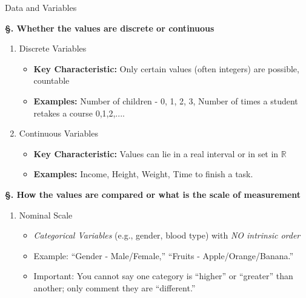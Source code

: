 \documentclass[8pt, usepdftitle=false]{beamer}
\begin{document}
\begin{frame}[allowframebreaks]{Data and Variables}
\begin{itemize}
\bigskip

\textbf{\S.  Whether the values are discrete or continuous}
\medskip
\begin{enumerate}
\item \alert{Discrete Variables}
\begin{itemize}
  \item \textbf{Key Characteristic:} Only certain values (often integers) are possible, countable
  \item \textbf{Examples:}  Number of children - 0, 1, 2, 3, Number of times a student retakes a course 0,1,2,....
\end{itemize}
\medskip
\item \alert{Continuous Variables}
\begin{itemize}
  \item  \textbf{Key Characteristic:} Values can lie in a real interval or in set in $\mathbb{R}$ 
  \item \textbf{Examples:}  Income, Height, Weight, Time to finish a task.
\end{itemize}
\medskip
\end{enumerate}





\framebreak


\textbf{\S. How the values are compared or what is the scale of measurement}
\medskip
\begin{enumerate}
\item \alert{Nominal Scale}
\medskip
\begin{itemize}
  \item \emph{Categorical Variables} (e.g., gender, blood type) with \emph{NO intrinsic order}
  \item Example: “Gender - Male/Female,” “Fruits - Apple/Orange/Banana.”
  \item Important: You cannot say one category is “higher” or “greater” than another; only comment they are “different.”



\end{itemize}
\end{enumerate}
\end{itemize}
\end{frame}
\end{document}
